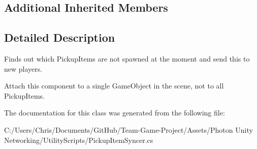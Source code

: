\subsection*{Additional Inherited Members}


\subsection{Detailed Description}
Finds out which Pickup\+Items are not spawned at the moment and send this to new players. 

Attach this component to a single Game\+Object in the scene, not to all Pickup\+Items.

The documentation for this class was generated from the following file\+:\begin{DoxyCompactItemize}
\item 
C\+:/\+Users/\+Chris/\+Documents/\+Git\+Hub/\+Team-\/\+Game-\/\+Project/\+Assets/\+Photon Unity Networking/\+Utility\+Scripts/Pickup\+Item\+Syncer.\+cs\end{DoxyCompactItemize}
